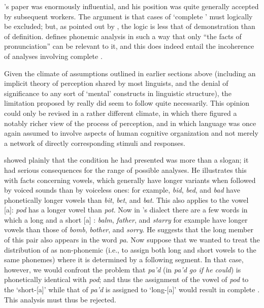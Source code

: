 {\Bloch}'s paper was enormously influential, and his position was quite
generally accepted by subsequent workers. The argument is that cases
of `complete ' must logically be excluded; but, as pointed
out by \citet[75]{kilbury76:morphophonemics}, the logic is less that
of demonstration than of definition. {\Bloch} defines phonemic analysis
in such a way that only ``the facts of pronunciation'' can be relevant
to it, and this does indeed entail the incoherence of analyses
involving complete .

Given the climate of assumptions outlined in earlier sections above
(including an implicit theory of perception shared by most linguists,
and the denial of significance to any sort of `mental' constructs in
linguistic structure), the limitation proposed by {\Bloch} really did
seem to follow quite necessarily. This opinion could only be revised
in a rather different climate, in which there figured a notably richer
view of the process of perception, and in which language was once
again assumed to involve aspects of human cognitive organization and
not merely a network of directly corresponding stimuli and responses.

{\Bloch} showed plainly that the condition he had presented was more than
a slogan; it had serious consequences for the range of possible
analyses. He illustrates this with facts concerning 
vowels, which generally have longer variants when followed by voiced
sounds than by voiceless ones: for example, \emph{bid}, \emph{bed},
and \emph{bad} have phonetically longer vowels than \emph{bit},
\emph{bet}, and \emph{bat}. This also applies to the vowel [a]:
\emph{pod} has a longer vowel than \emph{pot}. Now in {\Bloch}'s dialect
there are a few words in which a long and a short [a] :
\emph{balm}, \emph{father}, and \emph{starry} for example have longer
vowels than those of \emph{bomb}, \emph{bother}, and \emph{sorry}. He
suggests that the long member of this pair also appears in the word
\emph{pa}. Now suppose that we wanted to treat the distribution of
 as non-phonemic (i.e., to assign both long and short
vowels to the same phonemes) where it is determined by a following
segment. In that case, however, we would confront the problem that
\emph{pa'd} (in \emph{pa'd go if he could}) is phonetically identical
with \emph{pod}; and thus the assignment of the vowel of \emph{pod} to
the `short-[a]'  while that of \emph{pa'd} is assigned to
`long-[a]' would result in complete . This analysis must
thus be rejected.

